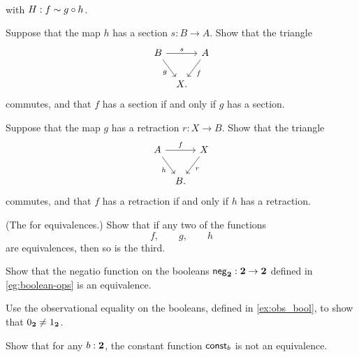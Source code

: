 \begin{exercises}
\begin{equation*}
\begin{tikzcd}[column sep=tiny]
    \end{tikzcd}
  \end{equation*}
  with $H:f\sim g\circ h$.
  \begin{subexenum}
  \item Suppose that the map $h$ has a section $s:B \to A$. Show that the triangle
    \begin{equation*}
      \begin{tikzcd}[column sep=tiny]
        B \arrow[rr,"s"] \arrow[dr,swap,"g"] & & A \arrow[dl,"f"] \\
        & X.
      \end{tikzcd}
    \end{equation*}
    commutes, and that $f$ has a section if and only if $g$ has a section.
  \item Suppose that the map $g$ has a retraction $r:X\to B$. Show that the triangle
    \begin{equation*}
      \begin{tikzcd}[column sep=tiny]
        A \arrow[rr,"f"] \arrow[dr,swap,"h"] & & X \arrow[dl,"r"] \\
        & B.
      \end{tikzcd}
    \end{equation*}
    commutes, and that $f$ has a retraction if and only if $h$ has a retraction.
  \item (The  for equivalences.) Show that if any two of the functions
    \begin{equation*}
      f,\qquad g,\qquad h
    \end{equation*}
    are equivalences, then so is the third.
  \end{subexenum}
\item \label{ex:neg_equiv} 
  \begin{subexenum}
  \item Show that the negatio function on the booleans $\mathsf{neg}_{\mathbf{2}}:\mathbf{2}\to\mathbf{2}$ defined in \cref{eg:boolean-ops} is an equivalence.
  \item Use the observational equality on the booleans, defined in \cref{ex:obs_bool}, to show that ${0_{\mathbf{2}}}\neq{1_{\ensuremath{\mathbf{2}}}}$.
  \item Show that for any $b:\mathbf{2}$, the constant function $\mathsf{const}_b$ is not an equivalence.

\end{subexenum}
\end{exercises}
